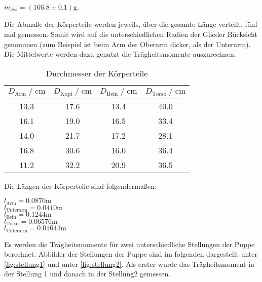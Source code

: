 \begin{center}
  $m_{ges} = (166.8\pm 0.1)\si{\gram}$.
\end{center}

Die Abmaße der Körperteile werden jeweils, über die gesamte Länge verteilt, fünf mal gemessen. Somit wird auf die unterschiedlichen
Radien der Glieder Rücksicht genommen (zum Beispiel ist beim Arm der Oberarm dicker, als der Unterarm). Die Mittelwerte werden dazu genutzt die
Trägheitsmomente auszurechnen.

\begin{table}
  \centering
    \caption{Durchmesser der Körperteile}
    \label{tab:durchmesser}
    \begin{tabular}{c c c c}
    \toprule
    $D_\text{Arm} \;/\; \si{\centi\meter}$ & $D_\text{Kopf} \;/\; \si{\centi\meter}$ & $D_\text{Bein} \;/\; \si{\centi\meter}$ & $D_\text{Torso} \;/\; \si{\centi\meter}$ \\
    \midrule
    13.3 & 17.6 & 13.4 & 40.0 \\
    16.1 & 19.0 & 16.5 & 33.4 \\
    14.0 & 21.7 & 17.2 & 28.1 \\
    16.8 & 30.6 & 16.0 & 36.4 \\
    11.2 & 32.2 & 20.9 & 36.5 \\
    \bottomrule
  \end{tabular}
\end{table}

Die Längen der Körperteile sind folgendermaßen:
\begin{center}
  $l_{\text{Arm}} = 0.0870 \si{\meter}$ \\
  $l_{\text{Unterarm}} = 0.0410 \si{\meter}$ \\
  $l_{\text{Bein}} = 0.1244 \si{\meter}$ \\
  $l_{\text{Torso}} = 0.06576 \si{\meter}$ \\
  $l_{\text{Unterarm}} = 0.01644 \si{\meter}$ \\
\end{center}


Es werden die Trägheitsmomente für zwei unterschiedliche Stellungen der Puppe berechnet. Abbilder der Stellungen der Puppe sind im folgenden
dargestellt unter \autoref{fig:stellung1} und unter \autoref{fig:stellung2}. 
Als erster wurde das Trägheitsmoment in der Stellung 1 und danach in der Stellung2 gemessen.



